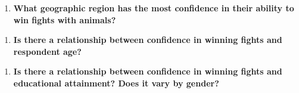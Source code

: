 \documentclass[
  letterpaper,
  DIV=11,
  numbers=noendperiod]{scrartcl}
\providecommand{\tightlist}{%
  \setlength{\itemsep}{0pt}\setlength{\parskip}{0pt}}\usepackage{longtable,booktabs,array}
\begin{document}
\begin{enumerate}
\def\labelenumi{\arabic{enumi}.}
\tightlist
\item
  \textbf{What geographic region has the most confidence in their
  ability to win fights with animals?}
\end{enumerate}

\begin{enumerate}
\def\labelenumi{\arabic{enumi}.}
\setcounter{enumi}{1}
\tightlist
\item
  \textbf{Is there a relationship between confidence in winning fights
  and respondent age?}
\end{enumerate}

\begin{enumerate}
\def\labelenumi{\arabic{enumi}.}
\setcounter{enumi}{2}
\tightlist
\item
  \textbf{Is there a relationship between confidence in winning fights
  and educational attainment? Does it vary by gender?}
\end{enumerate}
\end{document}
